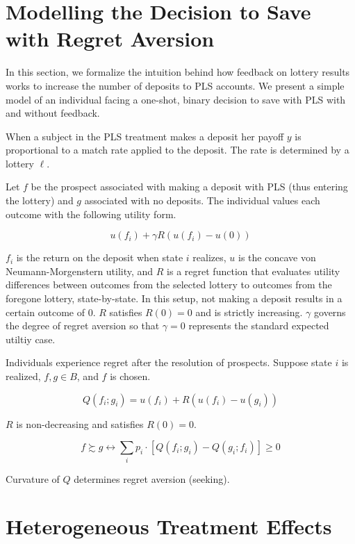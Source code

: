 \documentclass[11pt]{article}
\begin{document}
\newpage

\printbibliography

\appendix

\section{Modelling the Decision to Save with Regret Aversion}

	In this section, we formalize the intuition behind how feedback on lottery results works to increase the number of deposits to PLS accounts. We present a simple model of an individual facing a one-shot, binary decision to save with PLS with and without feedback. 

	When a subject in the PLS treatment makes a deposit her payoff $y$ is proportional to a match rate applied to the deposit. The rate is determined by a lottery $\ell$.

	Let $f$ be the prospect associated with making a deposit with PLS (thus entering the lottery) and $g$ associated with no deposits. The individual values each outcome with the following utility form.

		\[ u(f_i) + \gamma R(u(f_i) - u(0)) \]

	$f_i$ is the return on the deposit when state $i$ realizes, $u$ is the concave von Neumann-Morgenstern utility, and $R$ is a regret function that evaluates utility differences between outcomes from the selected lottery to outcomes from the foregone lottery, state-by-state. In this setup, not making a deposit results in a certain outcome of 0. $R$ satisfies $R(0) = 0$ and is strictly increasing. $\gamma$ governs the degree of regret aversion so that $\gamma = 0$ represents the standard expected utiltiy case.

	Individuals experience regret after the resolution of prospects. Suppose state $i$ is realized, $f, g \in B$, and $f$ is chosen.

		\[ Q(f_i; g_i) = u(f_i) + R(u(f_i) - u(g_i)) \]

	$R$ is non-decreasing and satisfies $R(0) = 0$.

		\[ f \succsim g \leftrightarrow \sum_i p_{i} \cdot [Q(f_i; g_i) - Q(g_i; f_i)] \geq 0 \]

	Curvature of $Q$ determines regret aversion (seeking).


\section{Heterogeneous Treatment Effects}
	
	
	
	
	
\end{document}
